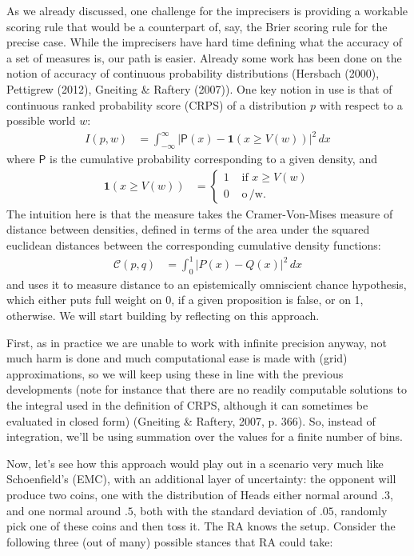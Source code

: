 \documentclass[
  10pt,
  dvipsnames,enabledeprecatedfontcommands]{scrartcl}
\begin{document}
As we already discussed, one challenge for the imprecisers is providing
a workable scoring rule that would be a counterpart of, say, the Brier
scoring rule for the precise case. While the imprecisers have hard time
defining what the accuracy of a set of measures is, our path is easier.
Already some work has been done on the notion of accuracy of continuous
probability distributions (Hersbach (2000), Pettigrew (2012), Gneiting
\& Raftery (2007)). One key notion in use is that of continuous ranked
probability score (CRPS) of a distribution \(p\) with respect to a
possible world \(w\): \begin{align*}
I(p,w) &= \int_{-\infty}^\infty \vert \mathsf{P}(x) - \mathbf{ 1 }(x\geq V(w))\vert ^2 \, dx
\end{align*} \noindent where \(\mathsf{P}\) is the cumulative
probability corresponding to a given density, and \begin{align*}
\mathbf{ 1 }(x \geq V(w)) & = \begin{cases} 1 & \text{ if } x \geq V(w)\\
0 & \text{ o$\,$/w. }
\end{cases}
\end{align*} \noindent  The intuition here is that the measure takes the
Cramer-Von-Mises measure of distance between densities, defined in terms
of the area under the squared euclidean distances between the
corresponding cumulative density functions: \begin{align*}
\mathcal{C}(p,q) & = \int_{0}^{1} \vert P(x) - Q(x)\vert^2 \, dx
\end{align*} \noindent and uses it to measure distance to an
epistemically omniscient chance hypothesis, which either puts full
weight on 0, if a given proposition is false, or on 1, otherwise. We
will start building by reflecting on this approach.

First, as in practice we are unable to work with infinite precision
anyway, not much harm is done and much computational ease is made with
(grid) approximations, so we will keep using these in line with the
previous developments (note for instance that there are no readily
computable solutions to the integral used in the definition of CRPS,
although it can sometimes be evaluated in closed form) (Gneiting \&
Raftery, 2007, p. 366). So, instead of integration, we'll be using
summation over the values for a finite number of bins.

Now, let's see how this approach would play out in a scenario very much
like Schoenfield's (EMC), with an additional layer of uncertainty: the
opponent will produce two coins, one with the distribution of Heads
either normal around \(.3\), and one normal around \(.5\), both with the
standard deviation of \(.05\), randomly pick one of these coins and then
toss it. The RA knows the setup. Consider the following three (out of
many) possible stances that RA could take:
\end{document}
